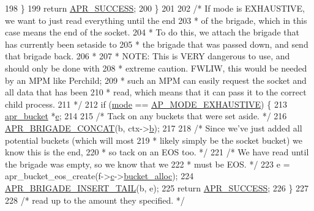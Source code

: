 \begin{DoxyCode}
198         \}
199         \textcolor{keywordflow}{return} \hyperlink{group__apr__errno_ga9ee311b7bf1c691dc521d721339ee2a6}{APR\_SUCCESS};
200     \}
201 
202     \textcolor{comment}{/* If mode is EXHAUSTIVE, we want to just read everything until the end}
203 \textcolor{comment}{     * of the brigade, which in this case means the end of the socket.}
204 \textcolor{comment}{     * To do this, we attach the brigade that has currently been setaside to}
205 \textcolor{comment}{     * the brigade that was passed down, and send that brigade back.}
206 \textcolor{comment}{     *}
207 \textcolor{comment}{     * NOTE:  This is VERY dangerous to use, and should only be done with}
208 \textcolor{comment}{     * extreme caution.  FWLIW, this would be needed by an MPM like Perchild;}
209 \textcolor{comment}{     * such an MPM can easily request the socket and all data that has been}
210 \textcolor{comment}{     * read, which means that it can pass it to the correct child process.}
211 \textcolor{comment}{     */}
212     \textcolor{keywordflow}{if} (\hyperlink{group__APACHE__CORE__FILTER_gad194431669b7d1f96d2dacfb7be21261}{mode} == \hyperlink{util__filter_8h_ab570898d09fbbe5b6d838e28b90134e0a4765fdaba2fdf4c349a78a8a3e2a0404}{AP\_MODE\_EXHAUSTIVE}) \{
213         \hyperlink{structapr__bucket}{apr\_bucket} *\hyperlink{group__APR__Util__Bucket__Brigades_gacd90314acb2c2e5cd19681136c08efac}{e};
214 
215         \textcolor{comment}{/* Tack on any buckets that were set aside. */}
216         \hyperlink{group__APR__Util__Bucket__Brigades_ga7cecbc89be912ce9ab24c889eb8f955b}{APR\_BRIGADE\_CONCAT}(b, ctx->\hyperlink{structcore__filter__ctx_ab083b63e4b9c6f6a8b722fefd6e18da3}{b});
217 
218         \textcolor{comment}{/* Since we've just added all potential buckets (which will most}
219 \textcolor{comment}{         * likely simply be the socket bucket) we know this is the end,}
220 \textcolor{comment}{         * so tack on an EOS too. */}
221         \textcolor{comment}{/* We have read until the brigade was empty, so we know that we}
222 \textcolor{comment}{         * must be EOS. */}
223         e = apr\_bucket\_eos\_create(f->\hyperlink{structap__filter__t_afb039953f0c62d8455aa9f4bdd3ef487}{c}->\hyperlink{structconn__rec_a5a9ee4911c5a655131f76a04036fb4c0}{bucket\_alloc});
224         \hyperlink{group__APR__Util__Bucket__Brigades_ga5447595f8374296c5ffe208db39b2f5d}{APR\_BRIGADE\_INSERT\_TAIL}(b, e);
225         \textcolor{keywordflow}{return} \hyperlink{group__apr__errno_ga9ee311b7bf1c691dc521d721339ee2a6}{APR\_SUCCESS};
226     \}
227 
228     \textcolor{comment}{/* read up to the amount they specified. */}

\end{DoxyCode}
